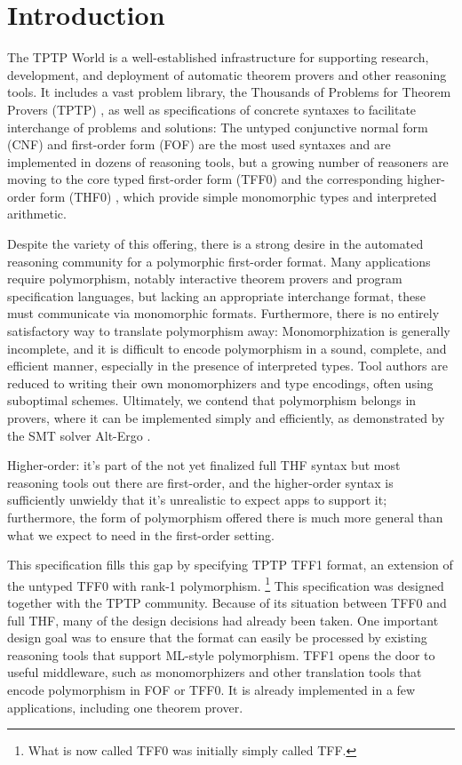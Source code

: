 \section{Introduction}
\label{sec_intro}

The TPTP World \cite{sutcliffe-2010-world} is a well-established infrastructure
for supporting research, development, and deployment of automatic theorem
provers and other reasoning tools. It includes a vast problem library, the
Thousands of Problems for Theorem Provers (TPTP) \cite{sutcliffe-2009-lib}, as
well as specifications of concrete syntaxes to facilitate interchange of
problems and solutions: The untyped conjunctive normal form (CNF) and
first-order form (FOF) are the most used syntaxes and are implemented in dozens
of reasoning tools, but a growing number of reasoners are moving to the core
typed first-order form (TFF0) \cite{TFF0} and the corresponding higher-order
form (THF0) \cite{benzmueller-et-al-2008-thf0}, which provide simple monomorphic
types and interpreted arithmetic.

Despite the variety of this offering, there is a strong desire in the automated
reasoning community for a polymorphic first-order format. Many applications
require polymorphism, notably interactive theorem provers and program
specification languages, but lacking an appropriate interchange format, these
must communicate via monomorphic formats. Furthermore, there is no entirely
satisfactory way to translate polymorphism away: Monomorphization is generally
incomplete, and it is difficult to encode polymorphism in a sound, complete, and
efficient manner, especially in the presence of interpreted types. Tool authors
are reduced to writing their own monomorphizers and type encodings, often using
suboptimal schemes. Ultimately, we contend that polymorphism belongs in provers,
where it can be implemented simply and efficiently, as demonstrated by the SMT
solver Alt-Ergo \cite{bobot-et-al-2008}.

Higher-order: it's part of the not yet finalized full THF syntax \cite{xxx} but
most reasoning tools out there are first-order, and the higher-order syntax is
sufficiently unwieldy that it's unrealistic to expect apps to support it;
furthermore, the form of polymorphism offered there is much more general than
what we expect to need in the first-order setting.

This specification fills this gap by specifying TPTP TFF1 format, an extension
of the untyped TFF0 with rank-1 polymorphism.%
\footnote{What is now called TFF0 was initially simply called TFF.}
This specification was designed together with the TPTP community. Because of its
situation between TFF0 and full THF, many of the design decisions had already
been taken. One important design goal was to ensure that the format can easily
be processed by existing reasoning tools that support ML-style polymorphism.
TFF1 opens the door to useful middleware, such as monomorphizers and other
translation tools that encode polymorphism in FOF or TFF0. It is already
implemented in a few applications, including one theorem prover.

